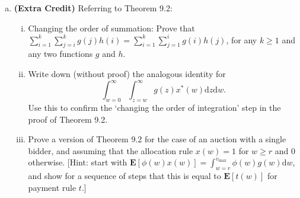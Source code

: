 \documentclass[11pt]{article}
\begin{document}
\begin{enumerate}[1.]
\begin{enumerate}[(a)]
\item \textbf{(Extra Credit)}  Referring to Theorem 9.2:
%
\begin{enumerate}[(i)]
\item Changing the order of summation:
Prove that $\sum_{i=1}^k\sum_{j=i}^kg(j)h(i)=\sum_{i=1}^k\sum_{j=1}^i g(i)h(j)$,
for any $k\geq 1$ and any two functions $g$ and $h$.
%
\item Write down (without proof) the analogous identity for
$$\int_{w=0}^\infty \int_{z=w}^\infty
g(z)x^\ast(w)\mathrm{d}z\mathrm{d}w.$$
%
%
%
Use this to confirm the `changing the order of integration' step in
 the proof of Theorem 9.2.
%
%
\item Prove a version of Theorem 9.2
for the case of an auction with a single bidder, and assuming that the
allocation rule $x(w)=1$ for $w\geq r$ and 0 otherwise.  [Hint: start
with ${\mathbf E}\left[\phi(w)x(w)\right]=\int_{w=r}^{v_{\max}}
\phi(w)g(w)\mathrm{d}w$, and show for a sequence of steps that this
is equal to ${\mathbf E}[t(w)]$ for payment rule $t$.]



\end{enumerate}

\end{enumerate}
\end{enumerate}
\end{document}
